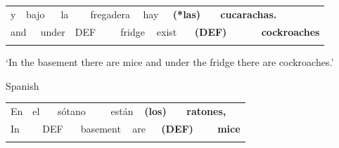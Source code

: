 \begin{tabular}{llllllllllllll}
\lsptoprule
y & \multicolumn{2}{l}{bajo

} & \multicolumn{2}{l}{la

} & \multicolumn{2}{l}{fregadera

} & \multicolumn{2}{l}{hay

} & \multicolumn{2}{l}{{\bfseries (*las)}

} & \multicolumn{2}{l}{{\bfseries cucarachas.}

} & \\
\multicolumn{2}{l}{and

} & \multicolumn{2}{l}{under

} & \multicolumn{2}{l}{DEF

} & \multicolumn{2}{l}{fridge

} & \multicolumn{2}{l}{exist

} & \multicolumn{2}{l}{{\bfseries (DEF)}

} & \multicolumn{2}{l}{{\bfseries cockroaches}

}\\
\lspbottomrule
\end{tabular}

\begin{styleTranslation}
‘In the basement there are mice and under the fridge there are cockroaches.’  

\end{styleTranslation}

\begin{listWWNumileveli}
\item {}

\begin{styleExample}
\label{bkm:Ref172696740}Spanish

\end{styleExample}

\end{listWWNumileveli}

\begin{tabular}{llllllllllll}
\lsptoprule
En & \multicolumn{2}{l}{el

} & \multicolumn{2}{l}{sótano

} & \multicolumn{2}{l}{están

} & \multicolumn{2}{l}{{\bfseries *(los)}

} & \multicolumn{2}{l}{{\bfseries ratones,}

} & \\
\multicolumn{2}{l}{In

} & \multicolumn{2}{l}{DEF

} & \multicolumn{2}{l}{basement

} & \multicolumn{2}{l}{are

} & \multicolumn{2}{l}{{\bfseries (DEF)}

} & \multicolumn{2}{l}{{\bfseries mice}

}\\
\lspbottomrule
\end{tabular}

